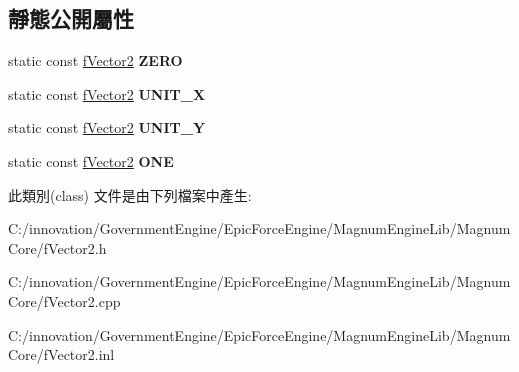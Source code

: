 \subsection*{靜態公開屬性}
\begin{DoxyCompactItemize}
\item 
static const \hyperlink{class_i_dream_sky_1_1f_vector2}{f\+Vector2} {\bfseries Z\+E\+RO}\hypertarget{class_i_dream_sky_1_1f_vector2_a55bf65d4ff0fd80b2d4a8d7c8e6c0212}{}\label{class_i_dream_sky_1_1f_vector2_a55bf65d4ff0fd80b2d4a8d7c8e6c0212}

\item 
static const \hyperlink{class_i_dream_sky_1_1f_vector2}{f\+Vector2} {\bfseries U\+N\+I\+T\+\_\+X}\hypertarget{class_i_dream_sky_1_1f_vector2_aa3ba7488e9f865fabbfc13436ab48030}{}\label{class_i_dream_sky_1_1f_vector2_aa3ba7488e9f865fabbfc13436ab48030}

\item 
static const \hyperlink{class_i_dream_sky_1_1f_vector2}{f\+Vector2} {\bfseries U\+N\+I\+T\+\_\+Y}\hypertarget{class_i_dream_sky_1_1f_vector2_a18ce79bcac3b843835d8291ef4b00e81}{}\label{class_i_dream_sky_1_1f_vector2_a18ce79bcac3b843835d8291ef4b00e81}

\item 
static const \hyperlink{class_i_dream_sky_1_1f_vector2}{f\+Vector2} {\bfseries O\+NE}\hypertarget{class_i_dream_sky_1_1f_vector2_af33113625a024f8291ab9bb8acfb5c06}{}\label{class_i_dream_sky_1_1f_vector2_af33113625a024f8291ab9bb8acfb5c06}

\end{DoxyCompactItemize}


此類別(class) 文件是由下列檔案中產生\+:\begin{DoxyCompactItemize}
\item 
C\+:/innovation/\+Government\+Engine/\+Epic\+Force\+Engine/\+Magnum\+Engine\+Lib/\+Magnum\+Core/f\+Vector2.\+h\item 
C\+:/innovation/\+Government\+Engine/\+Epic\+Force\+Engine/\+Magnum\+Engine\+Lib/\+Magnum\+Core/f\+Vector2.\+cpp\item 
C\+:/innovation/\+Government\+Engine/\+Epic\+Force\+Engine/\+Magnum\+Engine\+Lib/\+Magnum\+Core/f\+Vector2.\+inl\end{DoxyCompactItemize}
